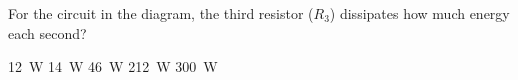 \documentclass{../../oss-classkick-exam}
\begin{document}
\begin{multicols}{2}
\begin{questions}
    \question For the circuit in the diagram, the third resistor ($R_3$)
    dissipates how much energy each second?
    \label{circ2-2}
    \begin{choices}
      \choice\SI{12}{\watt}
      \choice\SI{14}{\watt}
      \choice\SI{46}{\watt}
      \choice\SI{212}{\watt}
      \choice\SI{300}{\watt}
    \end{choices}
    \columnbreak
    
%
%    
%

\end{questions}
\end{multicols}
\end{document}
